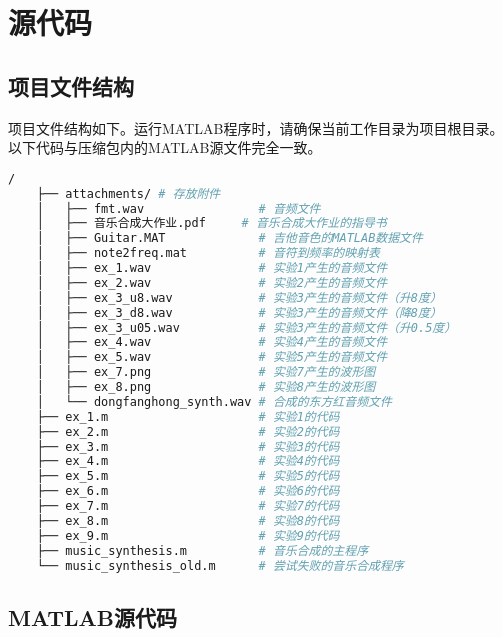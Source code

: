 \section{源代码}

\subsection{项目文件结构}
\label{subsec:project-structure}
项目文件结构如下。运行MATLAB程序时，请确保当前工作目录为项目根目录。以下代码与压缩包内的MATLAB源文件完全一致。
\begin{lstlisting}[language={bash}, numbers=none]
    /
    ├── attachments/ # 存放附件
    │   ├── fmt.wav                # 音频文件
    │   ├── 音乐合成大作业.pdf     # 音乐合成大作业的指导书
    │   ├── Guitar.MAT             # 吉他音色的MATLAB数据文件
    │   ├── note2freq.mat          # 音符到频率的映射表
    │   ├── ex_1.wav               # 实验1产生的音频文件
    │   ├── ex_2.wav               # 实验2产生的音频文件
    │   ├── ex_3_u8.wav            # 实验3产生的音频文件（升8度）
    │   ├── ex_3_d8.wav            # 实验3产生的音频文件（降8度）
    │   ├── ex_3_u05.wav           # 实验3产生的音频文件（升0.5度）
    │   ├── ex_4.wav               # 实验4产生的音频文件
    │   ├── ex_5.wav               # 实验5产生的音频文件
    │   ├── ex_7.png               # 实验7产生的波形图
    │   ├── ex_8.png               # 实验8产生的波形图
    │   └── dongfanghong_synth.wav # 合成的东方红音频文件
    ├── ex_1.m                     # 实验1的代码
    ├── ex_2.m                     # 实验2的代码
    ├── ex_3.m                     # 实验3的代码
    ├── ex_4.m                     # 实验4的代码
    ├── ex_5.m                     # 实验5的代码
    ├── ex_6.m                     # 实验6的代码
    ├── ex_7.m                     # 实验7的代码
    ├── ex_8.m                     # 实验8的代码
    ├── ex_9.m                     # 实验9的代码
    ├── music_synthesis.m          # 音乐合成的主程序
    └── music_synthesis_old.m      # 尝试失败的音乐合成程序
\end{lstlisting}

\subsection{MATLAB源代码}











